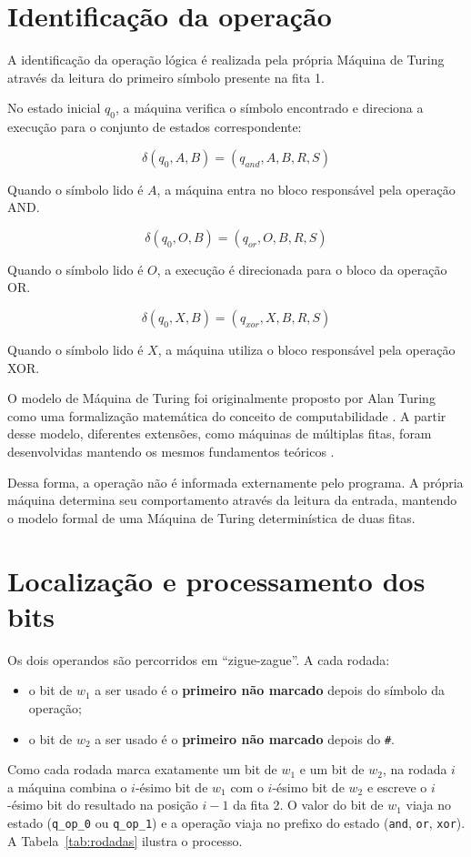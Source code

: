 \documentclass[report, 12pt]{uftreport}
\newcommand{\s}[1]{\texttt{#1}}
\begin{document}
\section{Identificação da operação}

A identificação da operação lógica é realizada pela própria Máquina de
Turing através da leitura do primeiro símbolo presente na fita 1.

No estado inicial $q_0$, a máquina verifica o símbolo encontrado e direciona a
execução para o conjunto de estados correspondente:

\[
\delta(q_0,A,B)=(q_{and},A,B,R,S)
\]

Quando o símbolo lido é $A$, a máquina entra no bloco responsável pela
operação AND.

\[
\delta(q_0,O,B)=(q_{or},O,B,R,S)
\]

Quando o símbolo lido é $O$, a execução é direcionada para o bloco da
operação OR.

\[
\delta(q_0,X,B)=(q_{xor},X,B,R,S)
\]

Quando o símbolo lido é $X$, a máquina utiliza o bloco responsável pela
operação XOR.

O modelo de Máquina de Turing foi originalmente proposto por Alan Turing como
uma formalização matemática do conceito de computabilidade
\cite{turing}. A partir desse modelo, diferentes extensões, como máquinas de
múltiplas fitas, foram desenvolvidas mantendo os mesmos fundamentos teóricos
\cite{sipser}.

Dessa forma, a operação não é informada externamente pelo programa. A própria
máquina determina seu comportamento através da leitura da entrada, mantendo
o modelo formal de uma Máquina de Turing determinística de duas fitas.
\section{Localização e processamento dos bits}

Os dois operandos são percorridos em ``zigue-zague''. A cada rodada:
\begin{itemize}
  \item o bit de $w_1$ a ser usado é o \textbf{primeiro não marcado} depois do
        símbolo da operação;
  \item o bit de $w_2$ a ser usado é o \textbf{primeiro não marcado} depois do
        \s{\#}.
\end{itemize}

Como cada rodada marca exatamente um bit de $w_1$ e um bit de $w_2$, na rodada $i$ a
máquina combina o $i$-ésimo bit de $w_1$ com o $i$-ésimo bit de $w_2$ e escreve o
$i$-ésimo bit do resultado na posição $i-1$ da fita 2. O valor do bit de $w_1$ viaja
no estado (\s{q\_op\_0} ou \s{q\_op\_1}) e a operação viaja no prefixo do estado
(\s{and}, \s{or}, \s{xor}). A Tabela~\ref{tab:rodadas} ilustra o processo.
\end{document}
